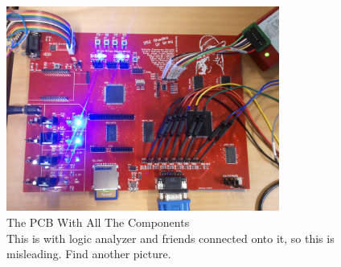 \begin{figure}[h]
  \centering
  \includegraphics[width=0.8\textwidth]{fig/pcb/pcbwithcomp.jpg}
  \caption[The PCB]{The PCB With All The Components \\
    \color{red} This is with logic analyzer and friends connected onto
    it, so this is misleading. Find another picture.}
  \label{fig:pcb-with-components}
\end{figure}
